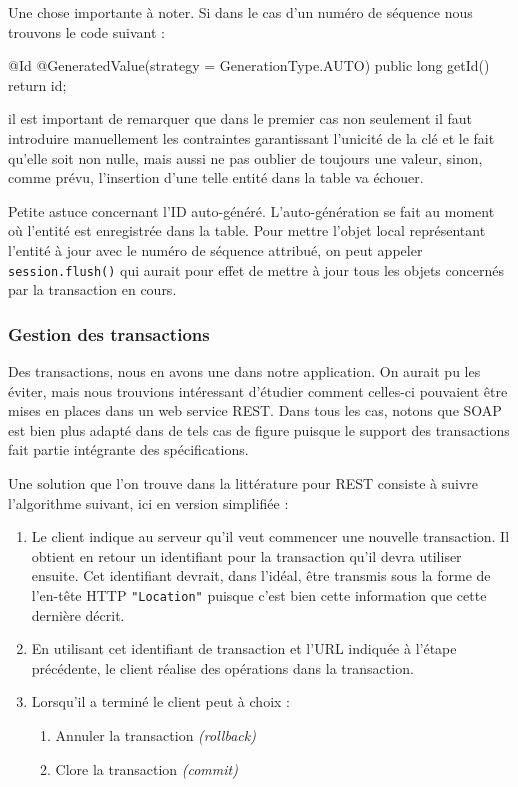Une chose importante à noter. Si dans le cas d'un numéro de séquence nous trouvons le code suivant :

\begin{javacode}
    @Id
    @GeneratedValue(strategy = GenerationType.AUTO)
    public long getId() {
        return id;
    }
\end{javacode}

il est important de remarquer que dans le premier cas non seulement il faut introduire manuellement
les contraintes garantissant l'unicité de la clé et le fait qu'elle soit non nulle, mais aussi ne pas oublier
de toujours  une valeur, sinon, comme prévu, l'insertion d'une telle entité dans la 
table va échouer.

Petite astuce concernant l'ID auto-généré. L'auto-génération se fait au moment où l'entité est enregistrée
dans la table. Pour mettre l'objet local représentant l'entité à jour avec le numéro de séquence attribué,
on peut appeler \verb|session.flush()| qui aurait pour effet de mettre à jour tous les objets concernés
par la transaction en cours.

\subsubsection{Gestion des transactions}

Des transactions, nous en avons une dans notre application. On aurait pu les éviter,
mais nous trouvions intéressant d'étudier comment celles-ci pouvaient être mises en places dans un web service REST.
Dans tous les cas, notons que SOAP est bien plus adapté dans de tels cas de figure puisque le support des transactions
fait partie intégrante des spécifications.

Une solution que l'on trouve dans la littérature pour REST consiste à suivre l'algorithme suivant, 
ici en version simplifiée :

\begin{enumerate}
    \item Le client indique au serveur qu'il veut commencer une nouvelle transaction. Il obtient en retour
          un identifiant pour la transaction qu'il devra utiliser ensuite. Cet identifiant devrait, dans l'idéal,
          être transmis sous la forme de l'en-tête HTTP \verb|"Location"| puisque c'est bien cette information
          que cette dernière décrit.
    \item En utilisant cet identifiant de transaction et l'URL indiquée à l'étape précédente, le client
          réalise des opérations dans la transaction.
    \item Lorsqu'il a terminé le client peut à choix :
    \begin{enumerate}[label=\alph*]
        \item Annuler la transaction \emph{(rollback)}
        \item Clore la transaction   \emph{(commit)}
    \end{enumerate}
\end{enumerate}

